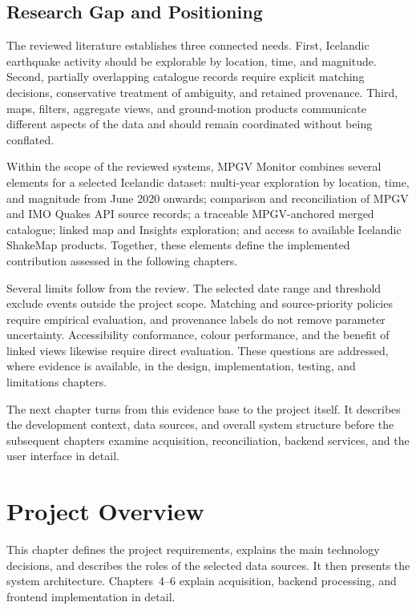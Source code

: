 \documentclass[12pt]{article}
\begin{document}
\subsection{Research Gap and Positioning}

The reviewed literature establishes three connected needs. First, Icelandic earthquake activity should be explorable by location, time, and magnitude. Second, partially overlapping catalogue records require explicit matching decisions, conservative treatment of ambiguity, and retained provenance. Third, maps, filters, aggregate views, and ground-motion products communicate different aspects of the data and should remain coordinated without being conflated.

Within the scope of the reviewed systems, MPGV Monitor combines several elements for a selected Icelandic dataset: multi-year exploration by location, time, and magnitude from June 2020 onwards; comparison and reconciliation of MPGV and IMO Quakes API source records; a traceable MPGV-anchored merged catalogue; linked map and Insights exploration; and access to available Icelandic ShakeMap products. Together, these elements define the implemented contribution assessed in the following chapters.

Several limits follow from the review. The selected date range and threshold exclude events outside the project scope. Matching and source-priority policies require empirical evaluation, and provenance labels do not remove parameter uncertainty. Accessibility conformance, colour performance, and the benefit of linked views likewise require direct evaluation. These questions are addressed, where evidence is available, in the design, implementation, testing, and limitations chapters.

The next chapter turns from this evidence base to the project itself. It describes the development context, data sources, and overall system structure before the subsequent chapters examine acquisition, reconciliation, backend services, and the user interface in detail.

\newpage

\section{Project Overview}
\label{sec:project-overview}

\label{subsec:project-overview-scope}

This chapter defines the project requirements, explains the main technology decisions, and describes the roles of the selected data sources. It then presents the system architecture. Chapters~4--6 explain acquisition, backend processing, and frontend implementation in detail.
\end{document}
